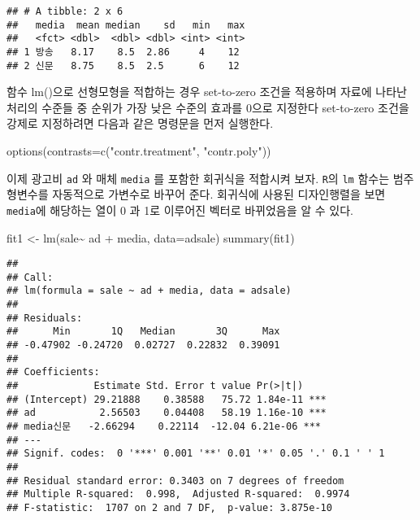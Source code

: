 \documentclass[
]{book}
\newenvironment{Shaded}{\begin{snugshade}}{\end{snugshade}}
\newcommand{\AttributeTok}[1]{\textcolor[rgb]{0.77,0.63,0.00}{#1}}
\newcommand{\FunctionTok}[1]{\textcolor[rgb]{0.00,0.00,0.00}{#1}}
\newcommand{\NormalTok}[1]{#1}
\newcommand{\OtherTok}[1]{\textcolor[rgb]{0.56,0.35,0.01}{#1}}
\newcommand{\SpecialCharTok}[1]{\textcolor[rgb]{0.00,0.00,0.00}{#1}}
\newcommand{\StringTok}[1]{\textcolor[rgb]{0.31,0.60,0.02}{#1}}
\begin{document}
\begin{verbatim}
## # A tibble: 2 x 6
##   media  mean median    sd   min   max
##   <fct> <dbl>  <dbl> <dbl> <int> <int>
## 1 방송   8.17    8.5  2.86     4    12
## 2 신문   8.75    8.5  2.5      6    12
\end{verbatim}

함수 lm()으로 선형모형을 적합하는 경우 set-to-zero 조건을 적용하며 자료에 나타난 처리의 수준들 중 순위가 가장 낮은 수준의 효과를 0으로 지정한다 set-to-zero 조건을 강제로 지정하려면 다음과 같은 명령문을 먼저 실행한다.

\begin{Shaded}
\begin{Highlighting}[]
\FunctionTok{options}\NormalTok{(}\AttributeTok{contrasts=}\FunctionTok{c}\NormalTok{(}\StringTok{"contr.treatment"}\NormalTok{, }\StringTok{"contr.poly"}\NormalTok{))}
\end{Highlighting}
\end{Shaded}

이제 광고비 \texttt{ad} 와 매체 \texttt{media} 를 포함한 회귀식을 적합시켜 보자. \texttt{R}의 \texttt{lm} 함수는
범주형변수를 자동적으로 가변수로 바꾸어 준다. 회귀식에 사용된 디자인행렬을 보면 \texttt{media}에 해당하는 열이 0 과 1로 이루어진 벡터로 바뀌었음을 알 수 있다.

\begin{Shaded}
\begin{Highlighting}[]
\NormalTok{fit1 }\OtherTok{\textless{}{-}} \FunctionTok{lm}\NormalTok{(sale}\SpecialCharTok{\textasciitilde{}}\NormalTok{ ad }\SpecialCharTok{+}\NormalTok{ media, }\AttributeTok{data=}\NormalTok{adsale)}
\FunctionTok{summary}\NormalTok{(fit1)}
\end{Highlighting}
\end{Shaded}

\begin{verbatim}
## 
## Call:
## lm(formula = sale ~ ad + media, data = adsale)
## 
## Residuals:
##      Min       1Q   Median       3Q      Max 
## -0.47902 -0.24720  0.02727  0.22832  0.39091 
## 
## Coefficients:
##             Estimate Std. Error t value Pr(>|t|)    
## (Intercept) 29.21888    0.38588   75.72 1.84e-11 ***
## ad           2.56503    0.04408   58.19 1.16e-10 ***
## media신문   -2.66294    0.22114  -12.04 6.21e-06 ***
## ---
## Signif. codes:  0 '***' 0.001 '**' 0.01 '*' 0.05 '.' 0.1 ' ' 1
## 
## Residual standard error: 0.3403 on 7 degrees of freedom
## Multiple R-squared:  0.998,  Adjusted R-squared:  0.9974 
## F-statistic:  1707 on 2 and 7 DF,  p-value: 3.875e-10
\end{verbatim}
\end{document}
